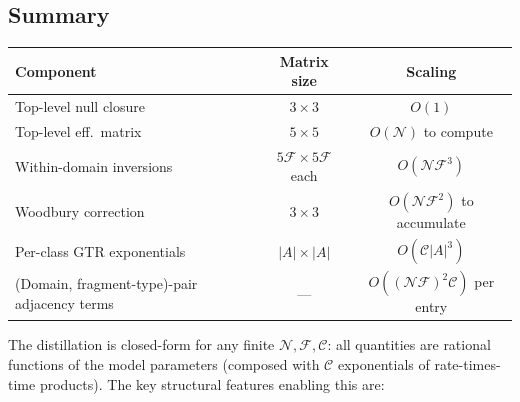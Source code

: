 \documentclass{article}
\newcommand\ndom{\mathcal{N}}
\newcommand\nfrag{\mathcal{F}}
\newcommand\alphabet{A}
\newcommand\nclasses{\mathcal{C}}
\begin{document}
\subsection{Summary}

\begin{center}
\begin{tabular}{lcc}
\toprule
Component & Matrix size & Scaling \\
\midrule
Top-level null closure & $3 \times 3$ & $O(1)$ \\
Top-level eff.\ matrix & $5 \times 5$ & $O(\ndom)$ to compute \\
Within-domain inversions & $5\nfrag \times 5\nfrag$ each & $O(\ndom\nfrag^3)$ \\
Woodbury correction & $3 \times 3$ & $O(\ndom\nfrag^2)$ to accumulate \\
Per-class GTR exponentials & $|\alphabet| \times |\alphabet|$ & $O(\nclasses |\alphabet|^3)$ \\
(Domain, fragment-type)-pair adjacency terms & --- & $O((\ndom\nfrag)^2 \nclasses)$ per entry \\
\bottomrule
\end{tabular}
\end{center}

\medskip
The distillation is closed-form for any finite $\ndom, \nfrag, \nclasses$:
all quantities are rational functions of the model parameters
(composed with $\nclasses$ exponentials of rate-times-time products).
The key structural features enabling this are:
\end{document}
